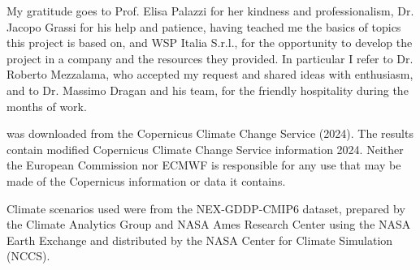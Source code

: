 My gratitude goes to Prof. Elisa Palazzi for her kindness and professionalism, Dr. Jacopo Grassi for his help and patience, having teached me the basics of topics this project is based on, and WSP Italia S.r.l., for the opportunity to develop the project in a company and the resources they provided. In particular I refer to Dr. Roberto Mezzalama, who accepted my request and shared ideas with enthusiasm, and to Dr. Massimo Dragan and his team, for the friendly hospitality during the months of work.

\cite{2023HersbachERA5Hourly} was downloaded from the Copernicus Climate Change Service (2024).
The results contain modified Copernicus Climate Change Service information 2024. Neither the European Commission nor ECMWF is responsible for any use that may be made of the Copernicus information or data it contains.

Climate scenarios used were from the NEX-GDDP-CMIP6 dataset, prepared by the Climate Analytics Group and NASA Ames Research Center using the NASA Earth Exchange and distributed by the NASA Center for Climate Simulation (NCCS).

\newpage
